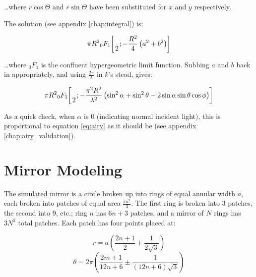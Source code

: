 \documentclass[etd,twoside,senior,noacknowledgments]{BYUPhys}
\newcommand*\pFqskip{8mu}
\newcommand*\pFq{\begingroup
        \catcode`\,\active
        \def ,{\mskip\pFqskip\relax}%
        \dopFq
}
\def\dopFq#1#2#3#4#5{%
        {}_{#1}F_{#2}\biggl[\genfrac..{0pt}{}{#3}{#4};#5\biggr]%
        \endgroup
}
\begin{document}
\ldots where $r\cos\Theta$ and $r\sin\Theta$ have been substituted for $x$ and $y$ respectively.

The solution (see appendix \ref{chap:integral}) is:

\begin{equation}\label{eq:expected_refl}
  \pi R^2 \pFq{0}{1}{}{2}{-\frac{R^2}{4}\left(a^2+b^2\right)}
\end{equation}

\ldots where ${}_0 F_1$ is the confluent hypergeometric limit function. Subbing $a$ and $b$ back in appropriately, and using $\frac{2\pi}{\lambda}$ in $k$'s stead, gives:

\begin{equation}
  \pi R^2 \pFq{0}{1}{}{2}{-\frac{\pi^2 R^2}{\lambda^2}\left(\sin^2\alpha+\sin^2\theta-2\sin\alpha\sin\theta\cos\phi\right)}
\end{equation}

As a quick check, when $\alpha$ is 0 (indicating normal incident light), this is proportional to equation \ref{eq:airy} as it should be (see appendix \ref{chap:airy_validation}).







\section{Mirror Modeling} \label{section:mirror_modeling}

The simulated mirror is a circle broken up into rings of equal annular width $a$, each broken into patches of equal area $\frac{\pi a^2}{3}$. The first ring is broken into 3 patches, the second into 9, etc.; ring $n$ has $6n+3$ patches, and a mirror of $N$ rings has $3N^2$ total patches. Each patch has four points placed at:

\begin{equation}
  r = a \left(\frac{2n+1}{2} \pm \frac{1}{2\sqrt{3}}\right)
\end{equation}
\begin{equation}
  \theta = 2\pi \left(\frac{2m+1}{12n+6} \pm \frac{1}{\left(12n+6\right)\sqrt{3}}\right)
\end{equation}
\end{document}
